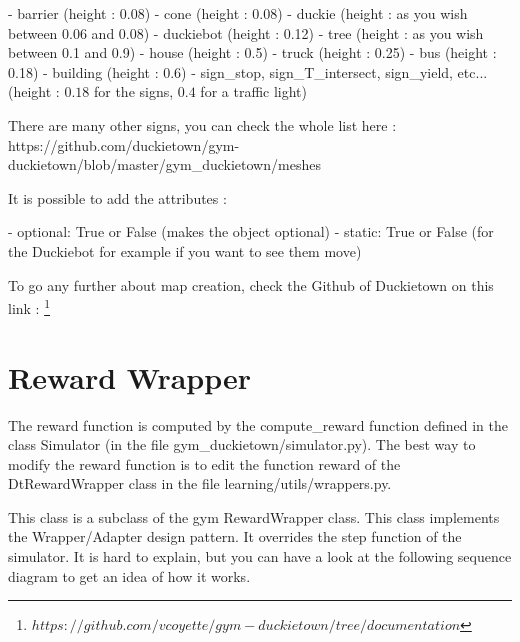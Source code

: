 \noindent- barrier (height : 0.08)\newline
\noindent- cone (height : 0.08)\newline
\noindent- duckie (height : as you wish between 0.06 and 0.08)\newline
\noindent- duckiebot (height : 0.12)\newline
\noindent- tree (height : as you wish between 0.1 and 0.9)\newline
\noindent- house (height : 0.5)\newline
\noindent- truck (height : 0.25)\newline
\noindent- bus (height : 0.18)\newline
\noindent- building (height : 0.6)\newline
\noindent- sign\_stop, sign\_T\_intersect, sign\_yield, etc... (height : $0.18$ for the signs, $0.4$ for a traffic light)\newline

There are many other signs, you can check the whole list here :\newline
https://github.com/duckietown/gym-duckietown/blob/master/gym\_duckietown/meshes\newline

It is possible to add the attributes : \newline

\noindent- optional: True or False (makes the object optional)\newline
\noindent- static: True or False (for the Duckiebot for example if you want to see them move)\newline

To go any further about map creation, check the Github of Duckietown on this link : \footnote{$https://github.com/vcoyette/gym-duckietown/tree/documentation$ }\newline

\section{Reward Wrapper}
The reward function is computed by the compute\_reward function defined in the class Simulator (in the file gym\_duckietown/simulator.py). The best way to modify the reward function is to edit the function reward of the DtRewardWrapper class in the file learning/utils/wrappers.py.

This class is a subclass of the gym RewardWrapper class. This class implements the Wrapper/Adapter design pattern. It overrides the step function of the simulator. It is hard to explain, but you can have a look at the following sequence diagram to get an idea of how it works.

